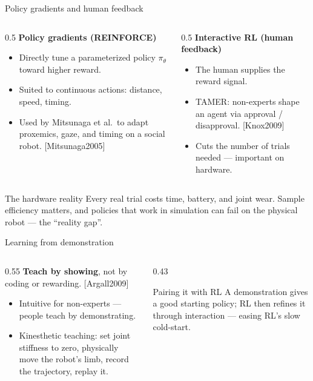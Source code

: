 \documentclass[aspectratio=169,10pt]{beamer}
\newcommand{\refnum}[1]{{\footnotesize\color{giuaccent}[#1]}}
\begin{document}
\begin{frame}{Policy gradients and human feedback}
  \begin{columns}[T]
    \begin{column}{0.5\textwidth}
      \textbf{Policy gradients (REINFORCE)}
      \begin{itemize}\footnotesize
        \item Directly tune a parameterized policy $\pi_\theta$ toward higher reward.
        \item Suited to continuous actions: distance, speed, timing.
        \item Used by Mitsunaga et al.\ to adapt proxemics, gaze, and timing on a social robot. \refnum{Mitsunaga2005}
      \end{itemize}
    \end{column}
    \begin{column}{0.5\textwidth}
      \textbf{Interactive RL (human feedback)}
      \begin{itemize}\footnotesize
        \item The human supplies the reward signal.
        \item TAMER: non-experts shape an agent via approval / disapproval. \refnum{Knox2009}
        \item Cuts the number of trials needed --- important on hardware.
      \end{itemize}
    \end{column}
  \end{columns}
  \vspace{0.6em}
  \begin{alertblock}{The hardware reality}
    Every real trial costs time, battery, and joint wear. Sample efficiency matters, and policies that work in simulation can fail on the physical robot --- the ``reality gap''.
  \end{alertblock}
\end{frame}

\begin{frame}{Learning from demonstration}
  \begin{columns}[T]
    \begin{column}{0.55\textwidth}
      \textbf{Teach by showing}, not by coding or rewarding. \refnum{Argall2009}
      \begin{itemize}
        \item Intuitive for non-experts --- people teach by demonstrating.
        \item Kinesthetic teaching: set joint stiffness to zero, physically move the robot's limb, record the trajectory, replay it.
      \end{itemize}
    \end{column}
    \begin{column}{0.43\textwidth}
      \begin{block}{Pairing it with RL}
        A demonstration gives a good starting policy; RL then refines it through interaction --- easing RL's slow cold-start.
      \end{block}
    \end{column}
  \end{columns}
\end{frame}
\end{document}
